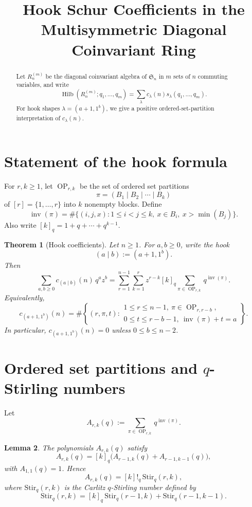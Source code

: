 \documentclass[11pt]{article}
\newtheorem{theorem}{Theorem}
\newtheorem{lemma}[theorem]{Lemma}
\DeclareMathOperator{\Hilb}{Hilb}
\DeclareMathOperator{\Inv}{inv}
\DeclareMathOperator{\OP}{OP}
\begin{document}
\title{Hook Schur Coefficients in the Multisymmetric Diagonal Coinvariant Ring}
\author{}
\date{}
\maketitle

\begin{abstract}
Let \(R_n^{(m)}\) be the diagonal coinvariant algebra of \(\mathfrak S_n\) in
\(m\) sets of \(n\) commuting variables, and write
\[
\Hilb(R_n^{(m)};q_1,\dots,q_m)
=
\sum_{\lambda} c_\lambda(n)s_\lambda(q_1,\dots,q_m).
\]
For hook shapes \(\lambda=(a+1,1^b)\), we give a positive ordered-set-partition
interpretation of \(c_\lambda(n)\).
\end{abstract}

\section{Statement of the hook formula}

For \(r,k\geq 1\), let \(\OP_{r,k}\) be the set of ordered set partitions
\[
\pi=(B_1\mid B_2\mid \cdots \mid B_k)
\]
of \([r]=\{1,\dots,r\}\) into \(k\) nonempty blocks. Define
\[
\Inv(\pi)
=
\#\{(i,j,x): 1\leq i<j\leq k,\ x\in B_i,\ x>\min(B_j)\}.
\]
Also write \([k]_q=1+q+\cdots+q^{k-1}\).

\begin{theorem}[Hook coefficients]
Let \(n\geq 1\). For \(a,b\geq 0\), write the hook
\[
(a\mid b):=(a+1,1^b).
\]
Then
\[
\boxed{
\sum_{a,b\geq 0} c_{(a\mid b)}(n)\,q^a z^b
=
\sum_{r=1}^{n-1}\sum_{k=1}^{r}
z^{r-k}[k]_q
\sum_{\pi\in \OP_{r,k}} q^{\Inv(\pi)}.
}
\]
Equivalently,
\[
\boxed{
c_{(a+1,1^b)}(n)
=
\#\left\{
(r,\pi,t):
\begin{array}{l}
1\leq r\leq n-1,\ \pi\in \OP_{r,r-b},\\
0\leq t\leq r-b-1,\ \Inv(\pi)+t=a
\end{array}
\right\}.
}
\]
In particular, \(c_{(a+1,1^b)}(n)=0\) unless \(0\leq b\leq n-2\).
\end{theorem}

\section{Ordered set partitions and \(q\)-Stirling numbers}

Let
\[
A_{r,k}(q):=\sum_{\pi\in \OP_{r,k}} q^{\Inv(\pi)}.
\]

\begin{lemma}
The polynomials \(A_{r,k}(q)\) satisfy
\[
A_{r,k}(q)=[k]_q\bigl(A_{r-1,k}(q)+A_{r-1,k-1}(q)\bigr),
\]
with \(A_{1,1}(q)=1\). Hence
\[
A_{r,k}(q)=[k]!_q\,\mathrm{Stir}_q(r,k),
\]
where \(\mathrm{Stir}_q(r,k)\) is the Carlitz \(q\)-Stirling number defined by
\[
\mathrm{Stir}_q(r,k)=[k]_q\,\mathrm{Stir}_q(r-1,k)+\mathrm{Stir}_q(r-1,k-1).
\]
\end{lemma}
\end{document}
